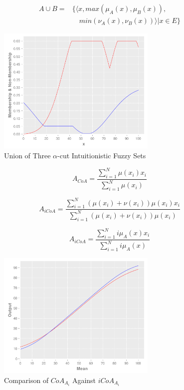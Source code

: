 \documentclass[conference]{IEEEtran}
\begin{document}
\begin{equation}
  \label{union-operator}
  \begin{aligned}
    A \cup B  = &\{ \langle x, max(\mu_{A} (x), \mu_{B} (x)),\\
    &\quad min(\nu_{A} (x), \nu_{B} (x)) \rangle | x \in E \}
\end{aligned}
\end{equation}

\begin{figure}[!t]
  \centering
  \includegraphics[width=3.0in]{ifs-union}
  \caption{Union of Three $\alpha$-cut Intuitionistic Fuzzy Sets}
  \label{ifs-union}
\end{figure}

\begin{equation}
  \label{center-of-area}
  A_{CoA} = \dfrac{\sum_{i=1}^{N} \mu(x_{i})
    x_{i}}{\sum_{i=1}^{N} \mu(x_{i})}
\end{equation}

\begin{equation}
  \label{if-coa}
  A_{iCoA} = \dfrac{\sum_{i=1}^{N} (\mu(x_{i}) + \nu(x_{i})) \mu(x_{i})
    x_{i}}{\sum_{i=1}^{N} (\mu(x_{i}) + \nu(x_{i})) \mu(x_{i})}
\end{equation}

\begin{equation}
  \label{if-coa-simplified}
  A_{iCoA} = \dfrac{\sum_{i=1}^{N} i\mu_{A}(x) x_{i}}{\sum_{i=1}^{N}
    i\mu_{A}(x)}
\end{equation}

\begin{figure}[!t]
  \centering
  \includegraphics[width=3.0in]{if-coa-vs-coa}
  \caption{Comparison of $CoA_{A_{i}}$ Against $iCoA_{A_{i}}$}
  \label{if-coa-vs-coa}
\end{figure}
\end{document}
